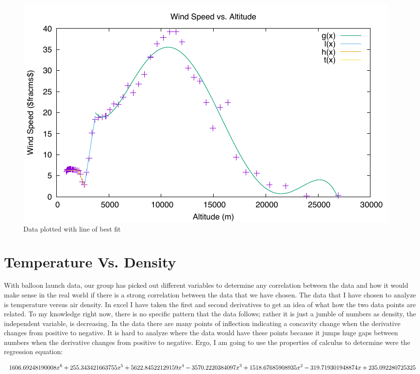 \documentclass{article}
\begin{document}
\begin{figure}[p]
\centering
\includegraphics{josh-data/figure2.pdf}
\caption{Data plotted with line of best fit}
\label{josh2}
\end{figure}


\part{Temperature Vs. Density}

With balloon launch data, our group has picked out different variables to determine any correlation between the data and how it would make sense in the real world if there is a strong correlation between the data that we have chosen.
The data that I have chosen to analyze is temperature versus air density. In excel I have taken the first and second derivatives to get an idea of what how the two data points are related. To my knowledge right now, there is no specific pattern that the data follows; rather it is just a jumble of numbers as density, the independent variable, is decreasing.
In the data there are many points of inflection indicating a concavity change when the derivative changes from positive to negative. It is hard to analyze where the data would have these points because it jumps huge gaps between numbers when the derivative changes from positive to negative. Ergo, I am going to use the properties of calculus to determine were the regression equation:

\begin{dmath*}
   1606.69248190008x^6 + 255.343421663755x^5 + 5622.84522129159x^4 \\ -3570.2220384097x^3 + 1518.67685908935x^2 -319.719301948874x +235.092280725325
 \end{dmath*}
\end{document}
